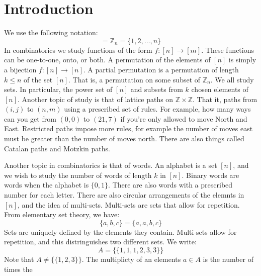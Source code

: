 \documentclass[crop=false,class=book,oneside]{standalone}
\begin{document}
    \section{Introduction}
        We use the following notation:
        \begin{equation}
            [n]=\mathbb{Z}_{n}=\{1,2,\hdots,n\}
        \end{equation}
        In combinatorics we study functions of the form
        $f:[n]\rightarrow[m]$. These functions can be
        one-to-one, onto, or both. A permutation of the
        elements of $[n]$ is simply a bijection
        $f:[n]\rightarrow[n]$. A partial permutation is a
        permutation of length $k\leq{n}$ of the set
        $[n]$. That is, a permutation on some subset of
        $\mathbb{Z}_{n}$. We all study sets. In particular,
        the power set of $[n]$ and subsets from $k$ chosen
        elements of $[n]$. Another topic of study is that of
        lattice paths on $\mathbb{Z}\times\mathbb{Z}$. That
        it, paths from $(i,j)$ to $(n,m)$ using a prescribed
        set of rules. For example, how many ways can you get
        from $(0,0)$ to $(21,7)$ if you're only allowed to move
        North and East. Restricted paths impose more rules,
        for example the number of moves east must be greater
        than the number of moves north. There are also things
        called Catalan paths and Motzkin paths.
        \par\hfill\par
        Another topic in combinatorics is that of words. An
        alphabet is a set $[n]$, and we wish to study the number
        of words of length $k$ in $[n]$. Binary words are words
        when the alphabet is $\{0,1\}$. There are also words
        with a prescribed number for each letter.
        There are also circular arrangements of the elemnts
        in $[n]$, and the idea of multi-sets. Multi-sets
        are sets that allow for repetition. From elementary
        set theory, we have:
        \begin{equation}
            \{a,b,c\}=\{a,a,b,c\}
        \end{equation}
        Sets are uniquely defined by the elements they contain.
        Multi-sets allow for repetition, and this distringuishes
        two different sets. We write:
        \begin{equation}
            A=\{\{1,1,1,2,3,3\}\}
        \end{equation}
        Note that $A\ne\{\{1,2,3\}\}$. The multiplicty of
        an elements $a\in{A}$ is the number of times the
\end{document}
